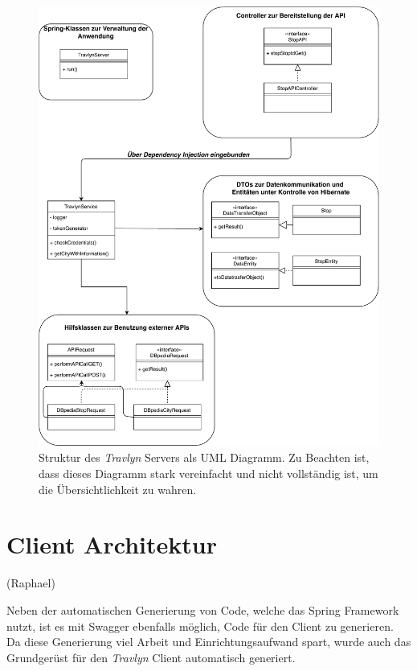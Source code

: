 	
	\begin{figure}[ht!]
		\centering
		\includegraphics[width=1\textwidth]{images/UML_Diagram.pdf}
		\caption{Struktur des \textit{Travlyn} Servers als UML Diagramm. Zu Beachten ist, dass dieses Diagramm stark vereinfacht und nicht vollständig ist, um die Übersichtlichkeit zu wahren.}
		\label{fig:UML}
	\end{figure}

	\clearpage

	\section{Client Architektur}
	
	(Raphael)
		
		Neben der automatischen Generierung von Code, welche das Spring Framework nutzt, ist es mit Swagger ebenfalls möglich, Code für den Client zu generieren. Da diese Generierung viel Arbeit und Einrichtungsaufwand spart, wurde auch das Grundgerüst für den \textit{Travlyn} Client automatisch generiert.
		
